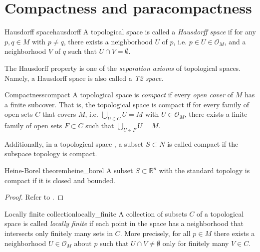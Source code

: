 \section{Compactness and paracompactness}

\begin{definition}{Hausdorff space}{hausdorff}
    A topological space  is called a \emph{Hausdorff space} if for any \(p,q\in M\) with \(p\neq q\), there exists a neighborhood \(U\) of \(p\), i.e. \(p \in U \in \mathcal{O}_M\), and a neighborhood \(V\) of \(q\) such that \(U \cap V = \emptyset\).
\end{definition}
\begin{remark}
    The Hausdorff property is one of the \emph{separation axioms} of topological spaces. Namely, a Hausdorff space is also called a \emph{T2 space}.
\end{remark}

\begin{definition}{Compactness}{compact}
    A topological space  is \emph{compact} if every \emph{open cover} of \(M\) has a finite subcover. That is, the topological space is compact if for every family of open sets \(C\) that covers \(M\), i.e. \(\bigcup_{U \in C}U = M\) with \(U \in \mathcal{O}_M\), there exists a finite family of open sets \(F \subset C\) such that \(\bigcup_{U\in F} U = M\).

    Additionally, in a topological space , a subset \(S\subset N\) is called compact if the subspace topology is compact.
\end{definition}

\begin{theorem}{Heine-Borel theorem}{heine_borel}
    A subset \(S\subset\mathbb{R}^n\) with the standard topology is compact if it is closed and bounded.
\end{theorem}
\begin{proof}
    Refer to \cite{babyrudin}.
\end{proof}

\begin{definition}{Locally finite collection}{locally_finite}
    A collection of subsets \(C\) of a topological space  is called \emph{locally finite} if each point in the space has a neighborhood that intersects only finitely many sets in \(C\). More precisely, for all \(p \in M\) there exists a neighborhood \(U \in \mathcal{O}_M\) about \(p\) such that \(U \cap V \neq \emptyset\) only for finitely many \(V \in C\).
\end{definition}

